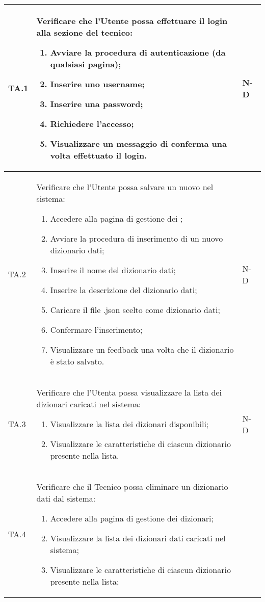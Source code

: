 \begin{adjustwidth}{-0.5cm}{-0.5cm}
\begin{longtable}{|P{1.5cm}|>{\raggedright}P{9.5cm}|>{\arraybackslash}P{1.5cm}|}
		TA.1 & Verificare che l'Utente possa effettuare il login alla sezione del tecnico:
		\begin{enumerate}
			\item Avviare la procedura di autenticazione (da qualsiasi pagina);
			\item Inserire uno username;
			\item Inserire una password;
			\item Richiedere l'accesso;
			\item Visualizzare un messaggio di conferma una volta effettuato il login.
		\end{enumerate}
		& N-D \\
		\hline TA.2 & Verificare che l'Utente possa salvare un nuovo  nel sistema:
		\begin{enumerate}
			\item Accedere alla pagina di gestione dei ;
			\item Avviare la procedura di inserimento di un nuovo dizionario dati;
			\item Inserire il nome del dizionario dati;
			\item Inserire la descrizione del dizionario dati;
			\item Caricare il file .json scelto come dizionario dati;
			\item Confermare l'inserimento;
			\item Visualizzare un feedback una volta che il dizionario è stato salvato.
		\end{enumerate}
		& N-D \\
		\hline TA.3 & Verificare che l'Utenta possa visualizzare la lista dei dizionari caricati nel sistema:
		\begin{enumerate}
			\item Visualizzare la lista dei dizionari disponibili;
			\item Visualizzare le caratteristiche di ciascun dizionario presente nella lista.
		\end{enumerate}
		& N-D \\
		\hline TA.4 & Verificare che il Tecnico possa eliminare un dizionario dati dal sistema:
		\begin{enumerate}
			\item Accedere alla pagina di gestione dei dizionari;
			\item Visualizzare la lista dei dizionari dati caricati nel sistema;
			\item Visualizzare le caratteristiche di ciascun dizionario presente nella lista;

\end{enumerate}
\end{longtable}
\end{adjustwidth}
